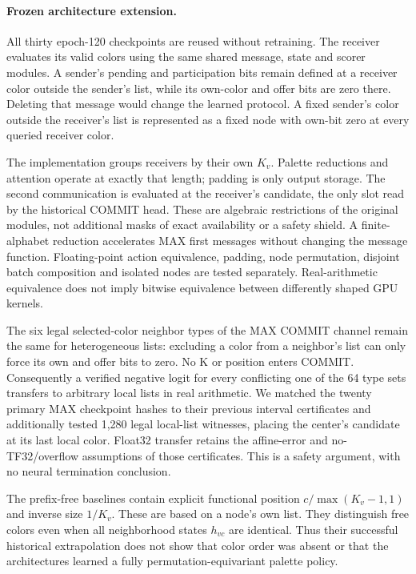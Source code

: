 \paragraph{Frozen architecture extension.}
All thirty epoch-120 checkpoints are reused without retraining. The receiver
evaluates its valid colors using the same shared message, state and scorer
modules. A sender's pending and participation bits remain defined at a receiver
color outside the sender's list, while its own-color and offer bits are zero
there. Deleting that message would change the learned protocol. A fixed
sender's color outside the receiver's list is represented as a fixed node with
own-bit zero at every queried receiver color.

The implementation groups receivers by their own $K_v$. Palette reductions
and attention operate at exactly that length; padding is only output storage.
The second communication is evaluated at the receiver's candidate, the only
slot read by the historical COMMIT head. These are algebraic restrictions of
the original modules, not additional masks of exact availability or a safety
shield. A finite-alphabet reduction accelerates MAX first messages without
changing the message function. Floating-point action equivalence, padding,
node permutation, disjoint batch composition and isolated nodes are tested
separately. Real-arithmetic equivalence does not imply bitwise equivalence
between differently shaped GPU kernels.

The six legal selected-color neighbor types of the MAX COMMIT channel remain
the same for heterogeneous lists: excluding a color from a neighbor's list can
only force its own and offer bits to zero. No K or position enters COMMIT.
Consequently a verified negative logit for every conflicting one of the 64
type sets transfers to arbitrary local lists in real arithmetic. We matched
the twenty primary MAX checkpoint hashes to their previous interval
certificates and additionally tested 1,280 legal local-list witnesses, placing
the center's candidate at its last local color. Float32 transfer retains the
affine-error and no-TF32/overflow assumptions of those certificates. This
is a safety argument, with no neural termination conclusion.

The prefix-free baselines contain explicit functional position
$c/\max(K_v-1,1)$ and inverse size $1/K_v$. These are based on a node's own
list. They distinguish free colors even when all neighborhood states $h_{vc}$
are identical. Thus their successful historical extrapolation does not show
that color order was absent or that the architectures learned a fully
permutation-equivariant palette policy.

